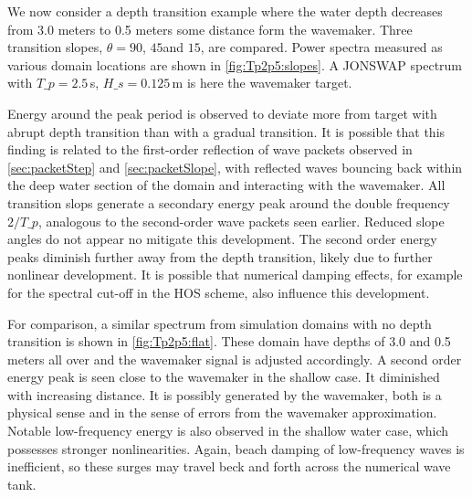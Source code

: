 

We now consider a depth transition example where the water depth decreases from 3.0 meters to 0.5 meters some distance form the wavemaker. 
Three transition slopes, $\theta = 90$\textdegree, $45$\textdegree and $15$\textdegree, are compared.
Power spectra measured as various domain locations are shown in \autoref{fig:Tp2p5:slopes}.
A JONSWAP spectrum with $T\_p=2.5$\,s, $H\_s=0.125$\,m is here the wavemaker target.

Energy around the peak period is observed to deviate more from target with abrupt depth transition than with a gradual transition. 
It is possible that this finding is related to the first-order reflection of wave packets observed in \autoref{sec:packetStep}  and  \ref{sec:packetSlope}, with reflected waves bouncing back within the deep water section of the domain and interacting with the wavemaker. 
All transition slops generate a secondary energy peak around the double frequency $2/T\_p$, analogous to the second-order wave packets seen earlier. 
Reduced slope angles do not appear no mitigate this development.
The second order energy peaks diminish further away from the depth transition, likely due to further nonlinear development. 
It is possible that numerical damping effects, for example for the spectral cut-off in the HOS scheme, also influence this development. 
 
For comparison, a similar spectrum from simulation domains with no depth transition is shown in \autoref{fig:Tp2p5:flat}.
These domain have depths of 3.0 and 0.5 meters all over and the wavemaker signal is adjusted accordingly. 
A second order energy peak is seen close to the wavemaker in the shallow case. It diminished with increasing distance. 
It is possibly generated by the wavemaker, both is a physical sense and in the sense of errors from the wavemaker approximation.
Notable low-frequency energy is also observed in the shallow water case, which possesses stronger nonlinearities. 
Again, beach damping of low-frequency waves is inefficient, so these surges may travel beck and forth across the numerical wave tank. 
\\

